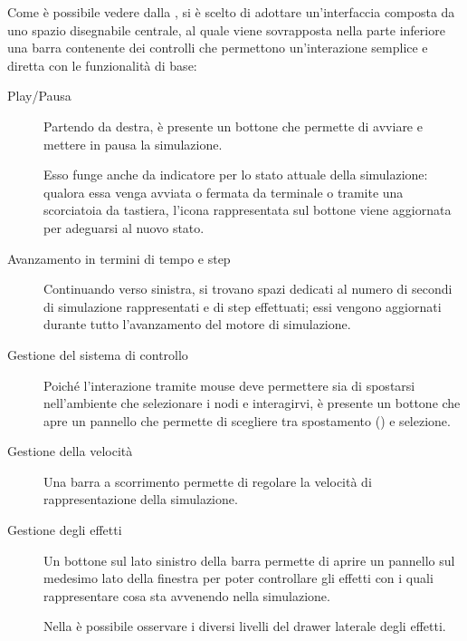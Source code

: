         Come è possibile vedere dalla , si è scelto di adottare un'interfaccia composta da uno spazio disegnabile centrale, al quale viene sovrapposta nella parte inferiore una barra contenente dei controlli che permettono un'interazione semplice e diretta con le funzionalità di base:

        \begin{description}
          \item [Play/Pausa] Partendo da destra, è presente un bottone che permette di avviare e mettere in pausa la simulazione.

          Esso funge anche da indicatore per lo stato attuale della simulazione: qualora essa venga avviata o fermata da terminale o tramite una scorciatoia da tastiera, l'icona rappresentata sul bottone viene aggiornata per adeguarsi al nuovo stato.

          \item[Avanzamento in termini di tempo e step] Continuando verso sinistra, si trovano spazi dedicati al numero di secondi di simulazione rappresentati e di step effettuati; essi vengono aggiornati durante tutto l'avanzamento del motore di simulazione.

          \item[Gestione del sistema di controllo] Poiché l'interazione tramite mouse deve permettere sia di spostarsi nell'ambiente che selezionare i nodi e interagirvi, è presente un bottone che apre un pannello che permette di scegliere tra spostamento () e selezione.

          \item[Gestione della velocità] Una barra a scorrimento permette di regolare la velocità di rappresentazione della simulazione.

          \item[Gestione degli effetti] Un bottone sul lato sinistro della barra permette di aprire un pannello sul medesimo lato della finestra per poter controllare gli effetti con i quali rappresentare cosa sta avvenendo nella simulazione.

          Nella  è possibile osservare i diversi livelli del drawer laterale degli effetti.


\end{description}
